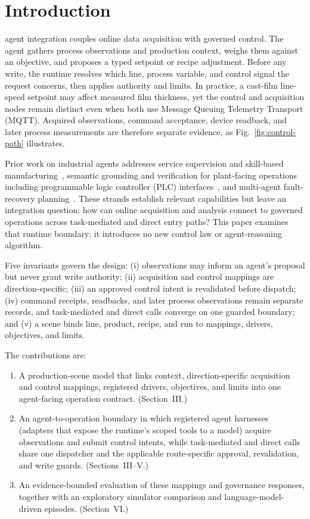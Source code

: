 \section{Introduction}
 agent integration couples online data acquisition with governed control. The agent gathers process observations and production context, weighs them against an objective, and proposes a typed setpoint or recipe adjustment. Before any write, the runtime resolves which line, process variable, and control signal the request concerns, then applies authority and limits. In practice, a cast-film line-speed setpoint may affect measured film thickness, yet the control and acquisition nodes remain distinct even when both use Message Queuing Telemetry Transport (MQTT). Acquired observations, command acceptance, device readback, and later process measurements are therefore separate evidence, as Fig.~\ref{fig:control-path} illustrates.

Prior work on industrial agents addresses service supervision and skill-based manufacturing~\cite{biskupovic2025supervision,koehle2026llmdriven}, semantic grounding and verification for plant-facing operations including programmable logic controller (PLC) interfaces~\cite{graul2026aas,schall2026safe}, and multi-agent fault-recovery planning~\cite{vyas2026detection}. These strands establish relevant capabilities but leave an integration question: how can online acquisition and analysis connect to governed operations across task-mediated and direct entry paths? This paper examines that runtime boundary; it introduces no new control law or agent-reasoning algorithm.

Five invariants govern the design: (i) observations may inform an agent's proposal but never grant write authority; (ii) acquisition and control mappings are direction-specific; (iii) an approved control intent is revalidated before dispatch; (iv) command receipts, readbacks, and later process observations remain separate records, and task-mediated and direct calls converge on one guarded boundary; and (v) a scene binds line, product, recipe, and run to mappings, drivers, objectives, and limits.

The contributions are:
\begin{enumerate}
  \item A production-scene model that links context, direction-specific acquisition and control mappings, registered drivers, objectives, and limits into one agent-facing operation contract. (Section~III.)
  \item An agent-to-operation boundary in which registered agent harnesses (adapters that expose the runtime's scoped tools to a model) acquire observations and submit control intents, while task-mediated and direct calls share one dispatcher and the applicable route-specific approval, revalidation, and write guards. (Sections~III--V.)
  \item An evidence-bounded evaluation of these mappings and governance responses, together with an exploratory simulator comparison and language-model-driven episodes. (Section~VI.)
\end{enumerate}

